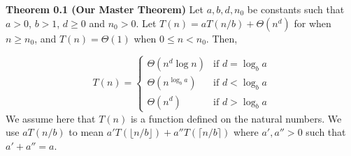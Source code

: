 \documentclass{article}
\begin{document}
\vspace{1cm}

\noindent \textbf{Theorem 0.1 (Our Master Theorem)} Let $a, b, d, n_0$ be constants such that $a > 0$, $b > 1$, $d \ge 0$ and $n_0 > 0$. Let $T(n) = aT(n/b) + \Theta(n^d)$ for when $n \ge n_0$, and $T(n) = \Theta(1)$ when $0 \le n < n_0$. Then,

\[
T(n) = \begin{cases}
    \Theta(n^d \log n) & \text{if } d = \log_b a \\
    \Theta(n^{\log_b a}) & \text{if } d < \log_b a \\
    \Theta(n^d) & \text{if } d > \log_b a
\end{cases}
\]
We assume here that $T(n)$ is a function defined on the natural numbers. We use $aT(n/b)$ to mean $a'T(\lfloor n/b \rfloor) + a''T(\lceil n/b \rceil)$ where $a', a'' > 0$ such that $a' + a'' = a$.
\end{document}
